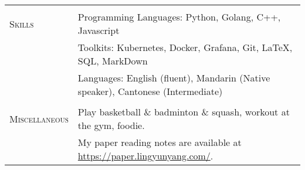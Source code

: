 \documentclass[letterpaper, 12pt]{article}
\begin{document}
\begin{longtable}{p{1.0in}p{5.8in}}

& \\

\nohyphens{\textsc{Skills}}
& Programming Languages: Python, Golang, C++, Javascript \\
& Toolkits: Kubernetes, Docker, Grafana, Git, \LaTeX, SQL, MarkDown \\
& Languages: English (fluent), Mandarin (Native speaker), Cantonese (Intermediate) \\
& \\


\nohyphens{\textsc{Miscellaneous}}
& Play basketball \& badminton \& squash, workout at the gym, foodie. \\
& My paper reading notes are available at \href{https://paper.lingyunyang.com/}{https://paper.lingyunyang.com/}. \\


\end{longtable}
\end{document}
